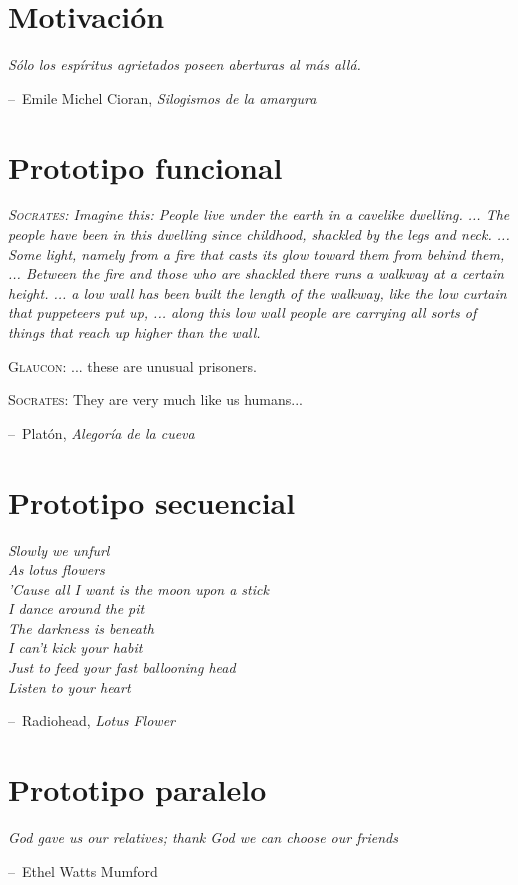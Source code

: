 \documentclass[12pt,letterpaper,titlepage,oneside,openright]{book}
\makeatletter
\newenvironment{chapquote}[2][2em]
  {\setlength{\@tempdima}{#1}%
   \def\chapquote@author{#2}%
   \parshape 1 \@tempdima \dimexpr\textwidth-2\@tempdima\relax%
   \itshape}
  {\par\vspace{.5em}\normalfont\hfill--\ \chapquote@author\hspace*{\@tempdima}\par\bigskip}
\makeatother
\begin{document}
\lipsum[1-2]

\chapter{Motivación}

\begin{chapquote}{Emile Michel Cioran, \textit{Silogismos de la amargura}}
Sólo los espíritus agrietados poseen aberturas al más allá.
\end{chapquote}

\lipsum[1-2]

\chapter{Prototipo funcional}

\begin{chapquote}{Platón, \textit{Alegoría de la cueva}}
\textsc{Socrates}: Imagine this: People live under the earth in a cavelike dwelling. ... The people have been in this dwelling since childhood, shackled by the legs and neck. ... Some light, namely from a fire that casts its glow toward them from behind them, ... Between the fire and those who are shackled there runs a walkway at a certain height. ... a low wall has been built the length of the walkway, like the low curtain that puppeteers put up, ... along this low wall people are carrying all sorts of things that reach up higher than the wall.

\vspace{1em}

\textsc{Glaucon}: ... these are unusual prisoners.

\textsc{Socrates}: They are very much like us humans...
\end{chapquote}

\lipsum[1-2]

\chapter{Prototipo secuencial}

\begin{chapquote}{Radiohead, \textit{Lotus Flower}}
\noindent Slowly we unfurl\\
As lotus flowers\\
'Cause all I want is the moon upon a stick\\
I dance around the pit\\
The darkness is beneath\\
I can't kick your habit\\
Just to feed your fast ballooning head\\
Listen to your heart
\end{chapquote}

\lipsum[1-2]

\chapter{Prototipo paralelo}

\begin{chapquote}{Ethel Watts Mumford}
\noindent God gave us our relatives; thank God we can choose our friends
\end{chapquote}

\lipsum[1-2]
\end{document}
